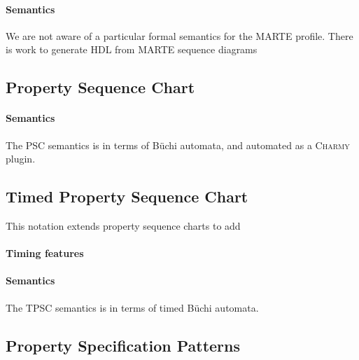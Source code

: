 \paragraph{Semantics}
We are not aware of a particular formal semantics for the MARTE profile.
There is work to generate HDL from MARTE sequence diagrams~

\subsection{Property Sequence Chart}

\paragraph{Semantics}
The PSC semantics is in terms of B\"uchi automata, and automated as a
\textsc{Charmy} plugin.

\subsection{Timed Property Sequence Chart}
This notation extends property sequence charts to add 

\paragraph{Timing features}

\paragraph{Semantics}
The TPSC semantics is in terms of timed B\"uchi automata.

\subsection{Property Specification Patterns}

